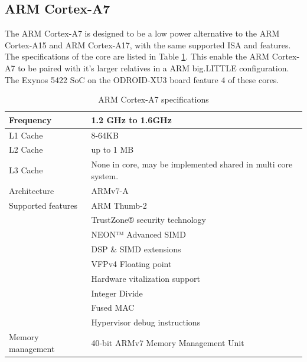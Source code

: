 \subsection{ARM Cortex-A7}
The ARM Cortex-A7 is designed to be a low power alternative to the ARM Cortex-A15 and ARM Cortex-A17, with the same supported ISA and features.
The specifications of the core are listed in Table \ref{A7}.
This enable the ARM Cortex-A7 to be paired with it's larger relatives in a ARM big.LITTLE configuration.
The Exynos 5422 SoC on the ODROID-XU3 board feature 4 of these cores.
\begin{table}[H]
  \centering
  \begin{tabular}{ll}
    \toprule
    Frequency         & 1.2 GHz to 1.6GHz  \\
    \midrule
    L1 Cache          & 8-64KB \\
    L2 Cache          & up to 1 MB \\
    L3 Cache          & None in core, may be implemented shared in multi core system. \\
    \midrule
    Architecture      & ARMv7-A            \\
    \midrule
    Supported features& ARM Thumb-2 \\
                      & TrustZone® security technology \\
                      & NEON™ Advanced SIMD \\
                      & DSP \& SIMD extensions \\
                      & VFPv4 Floating point \\
                      & Hardware vitalization support \\
                      & Integer Divide \\
                      & Fused MAC \\
                      & Hypervisor debug instructions \\
    \midrule
    Memory management & 40-bit ARMv7 Memory Management Unit \\
    \bottomrule
  \end{tabular}
  \caption{ARM Cortex-A7 specifications\label{A7}}
\end{table}
